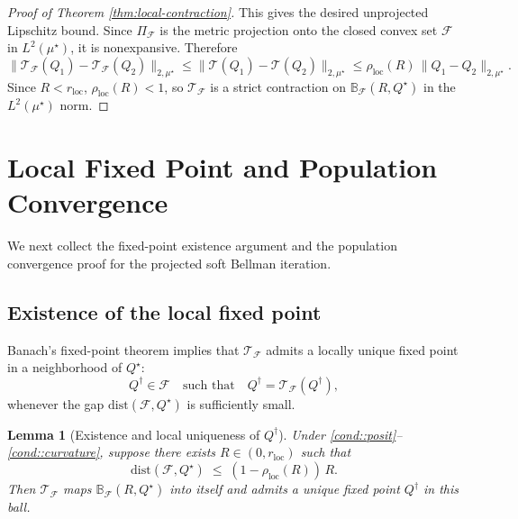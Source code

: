 \documentclass{article}
\theoremstyle{plain}
\newtheorem{lemma}{Lemma}
\theoremstyle{definition}
\theoremstyle{remark}
\begin{document}
\begin{proof}[Proof of Theorem \ref{thm:local-contraction}]
This gives the desired unprojected Lipschitz bound. Since
$\Pi_{\mathcal F}$ is the metric projection onto the closed convex set
$\mathcal F$ in $L^2(\mu^\star)$, it is nonexpansive. Therefore
\[
\|\mathcal T_{\mathcal F}(Q_1)-\mathcal T_{\mathcal F}(Q_2)\|_{2,\mu^\star}
\le
\|\mathcal T(Q_1)-\mathcal T(Q_2)\|_{2,\mu^\star}
\le
\rho_{\mathrm{loc}}(R)\,\|Q_1-Q_2\|_{2,\mu^\star}.
\]
Since \(R<r_{\mathrm{loc}}\), \(\rho_{\mathrm{loc}}(R)<1\), so
\(\mathcal T_{\mathcal F}\) is a strict contraction on
\(\mathbb{B}_{\mathcal{F}}(R,Q^\star)\) in the
$L^2(\mu^\star)$ norm.
\end{proof}

\section{Local Fixed Point and Population Convergence}
\label{app:local-fixed-point-population-convergence}

We next collect the fixed-point existence argument and the population convergence proof for the projected soft Bellman iteration.

\subsection{Existence of the local fixed point}

Banach's fixed-point
theorem implies that $\mathcal T_{\mathcal F}$ admits a locally
unique fixed point in a neighborhood of $Q^\star$:
\[
Q^\dagger \in \mathcal F
\quad\text{such that}\quad
Q^\dagger = \mathcal T_{\mathcal F}(Q^\dagger),
\]
whenever the gap $\mathrm{dist}(\mathcal F, Q^\star)$ is sufficiently
small.

\begin{lemma}[Existence and local uniqueness of $Q^\dagger$]
\label{lem:proj-fixed-point}
Under \ref{cond::posit}--\ref{cond::curvature}, suppose there
exists \(R \in (0,r_{\mathrm{loc}})\) such that
\begin{equation}
\label{eq:invariance-condition}
\mathrm{dist}(\mathcal F,Q^\star)
\;\le\;
(1-\rho_{\mathrm{loc}}(R))\,R.
\end{equation}
Then $\mathcal T_{\mathcal F}$ maps
$\mathbb{B}_{\mathcal F}(R,Q^\star)$ into itself and admits a unique
fixed point $Q^\dagger$ in this ball.
\end{lemma}
\end{document}
